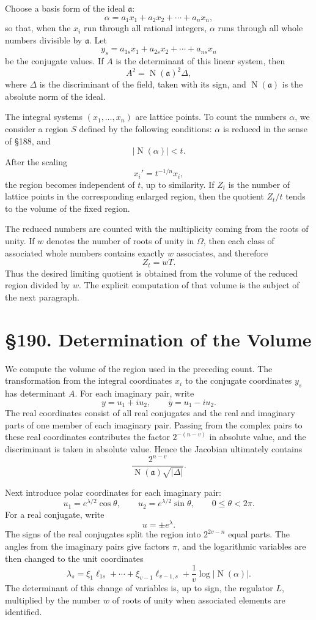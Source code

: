 \documentclass[12pt,a4paper]{article}
\newcommand{\webersection}[2]{\clearpage\section*{\S #1. #2}}
\newcommand{\ideala}{\mathfrak a}
\newcommand{\N}{\operatorname{N}}
\begin{document}
Choose a basis form of the ideal \(\ideala\):
\[
  \alpha=a_1x_1+a_2x_2+\cdots+a_nx_n,
\tag{1}
\]
so that, when the \(x_i\) run through all rational integers, \(\alpha\) runs through all whole numbers divisible by \(\ideala\).  Let
\[
  y_s=a_{1s}x_1+a_{2s}x_2+\cdots+a_{ns}x_n
\tag{2}
\]
be the conjugate values.  If \(A\) is the determinant of this linear system, then
\[
  A^2=
\N(\ideala)^2\Delta,
\tag{3}
\]
where \(\Delta\) is the discriminant of the field, taken with its sign, and \(\N(\ideala)\) is the absolute norm of the ideal.

The integral systems \((x_1,
\ldots,x_n)\) are lattice points.  To count the numbers \(\alpha\), we consider a region \(S\) defined by the following conditions: \(\alpha\) is reduced in the sense of \S188, and
\[
  |
\N(\alpha)|<t.
\tag{4}
\]
After the scaling
\[
  x_i'=t^{-1/n}x_i,
\]
the region becomes independent of \(t\), up to similarity.  If \(Z_t\) is the number of lattice points in the corresponding enlarged region, then the quotient \(Z_t/t\) tends to the volume of the fixed region.

The reduced numbers are counted with the multiplicity coming from the roots of unity.  If \(w\) denotes the number of roots of unity in \(\Omega\), then each class of associated whole numbers contains exactly \(w\) associates, and therefore
\[
  Z_t=wT.
\tag{5}
\]
Thus the desired limiting quotient is obtained from the volume of the reduced region divided by \(w\).  The explicit computation of that volume is the subject of the next paragraph.

\webersection{190}{Determination of the Volume}

We compute the volume of the region used in the preceding count.  The transformation from the integral coordinates \(x_i\) to the conjugate coordinates \(y_s\) has determinant \(A\).  For each imaginary pair, write
\[
  y=u_1+iu_2,
\qquad \overline y=u_1-iu_2.
\tag{1}
\]
The real coordinates consist of all real conjugates and the real and imaginary parts of one member of each imaginary pair.  Passing from the complex pairs to these real coordinates contributes the factor \(2^{-(n-v)}\) in absolute value, and the discriminant is taken in absolute value.  Hence the Jacobian ultimately contains
\[
  \frac{2^{n-v}}{\N(\ideala)\sqrt{|\Delta|}}.
\tag{2}
\]

Next introduce polar coordinates for each imaginary pair:
\[
  u_1=e^{\lambda/2}\cos\theta,
\qquad
  u_2=e^{\lambda/2}\sin\theta,
\qquad 0\le\theta<2\pi.
\tag{3}
\]
For a real conjugate, write
\[
  u=\pm e^\lambda.
\tag{4}
\]
The signs of the real conjugates split the region into \(2^{2v-n}\) equal parts.  The angles from the imaginary pairs give factors \(\pi\), and the logarithmic variables are then changed to the unit coordinates
\[
  \lambda_s=\xi_1\ell_{1s}+\cdots+\xi_{v-1}\ell_{v-1,s}+\frac{1}{v}\log|
\N(\alpha)|.
\tag{5}
\]
The determinant of this change of variables is, up to sign, the regulator \(L\), multiplied by the number \(w\) of roots of unity when associated elements are identified.
\end{document}
